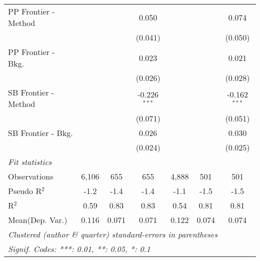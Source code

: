 \begin{tabular}{lcccccc}
   PP Frontier - Method &         &         & 0.050          &         &         & 0.074\\   
                        &         &         & (0.041)        &         &         & (0.050)\\   
   PP Frontier - Bkg.   &         &         & 0.023          &         &         & 0.021\\   
                        &         &         & (0.026)        &         &         & (0.028)\\   
   SB Frontier - Method &         &         & -0.226$^{***}$ &         &         & -0.162$^{***}$\\   
                        &         &         & (0.071)        &         &         & (0.051)\\   
   SB Frontier - Bkg.   &         &         & 0.026          &         &         & 0.030\\   
                        &         &         & (0.024)        &         &         & (0.025)\\   
   \midrule
   \emph{Fit statistics}\\
   Observations         & 6,106   & 655     & 655            & 4,888   & 501     & 501\\  
   Pseudo R$^2$         & -1.2    & -1.4    & -1.4           & -1.1    & -1.5    & -1.5\\  
   R$^2$                & 0.59    & 0.83    & 0.83           & 0.54    & 0.81    & 0.81\\  
Mean(Dep. Var.) & 0.116 & 0.071 & 0.071 & 0.122 & 0.074 & 0.074 \\
   \midrule \midrule
   \multicolumn{7}{l}{\emph{Clustered (author \& quarter) standard-errors in parentheses}}\\
   \multicolumn{7}{l}{\emph{Signif. Codes: ***: 0.01, **: 0.05, *: 0.1}}\\
\end{tabular}
\par\endgroup
